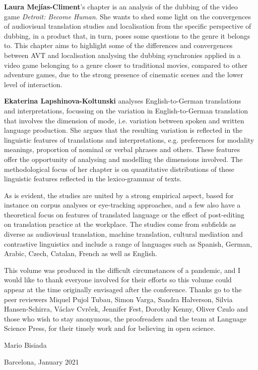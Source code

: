 \begin{refsection}
\textbf{Laura Mejías-Climent}’s chapter is an analysis of the dubbing of the video game \textit{Detroit: Become Human}. She wants to shed some light on the convergences of audiovisual translation studies and localisation from the specific perspective of dubbing, in a product that, in turn, poses some questions to the genre it belongs to. This chapter aims to highlight some of the differences and convergences between AVT and localisation analysing the dubbing synchronies applied in a video game belonging to a genre closer to traditional movies, compared to other adventure games, due to the strong presence of cinematic scenes and the lower level of interaction.

\hspace*{-1.5mm}\textbf{Ekaterina Lapshinova-Koltunski} analyses English-to-German translations and interpretations, focussing on the variation in English-to-German translation that involves the dimension of mode, i.e. variation between spoken and written language production. She argues that the resulting variation is reflected in the linguistic features of translations and interpretations, e.g. preferences for modality meanings, proportion of nominal or verbal phrases and others. These features offer the opportunity of analysing and modelling the dimensions involved. The methodological focus of her chapter is on quantitative distributions of these linguistic features reflected in the lexico-grammar of texts.

As is evident, the studies are united by a strong empirical aspect, based for instance on corpus analyses or eye-tracking approaches, and a few also have a theoretical focus on features of translated language or the effect of post-editing on translation practice at the workplace. The studies come from subfields as diverse as audiovisual translation, machine translation, cultural mediation and contrastive linguistics and include a range of languages such as Spanish, German, Arabic, Czech, Catalan, French as well as English.

This volume was produced in the difficult circumstances of a pandemic, and I would like to thank everyone involved for their efforts so this volume could appear at the time originally envisaged after the conference. Thanks go to the peer reviewers Miquel Pujol Tubau, Simon Varga, Sandra Halverson, Silvia Hansen-Schirra, Václav Cvrček, Jennifer Fest, Dorothy Kenny, Oliver Czulo and those who wish to stay anonymous, the proofreaders and the team at Language Science Press, for their timely work and for believing in open science.\bigskip

\begin{flushright}
  \noindent Mario Bisiada

  \noindent Barcelona, January 2021
\end{flushright}


{\sloppy\printbibliography[heading=subbibliography]}
\end{refsection}

